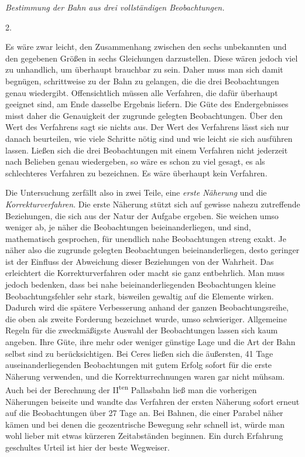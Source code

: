 %
\begin{center}\emph{Bestimmung der Bahn aus drei vollständigen Beobachtungen.}\end{center}
\begin{center}2.\end{center}
Es wäre zwar leicht, den Zusammenhang zwischen den sechs unbekannten und den gegebenen Größen in sechs Gleichungen darzustellen. Diese wären jedoch viel zu unhandlich, um überhaupt brauchbar zu sein. Daher muss man sich damit begnügen, schrittweise zu der Bahn zu gelangen, die die drei Beobachtungen genau wiedergibt. Offensichtlich müssen alle Verfahren, die dafür überhaupt geeignet sind, am Ende dasselbe Ergebnis liefern. Die Güte des Endergebnisses misst daher die Genauigkeit der zugrunde gelegten Beobachtungen. Über den Wert des Verfahrens sagt sie nichts aus. Der Wert des Verfahrens lässt sich nur danach beurteilen, wie viele Schritte nötig sind und wie leicht sie sich ausführen lassen. Ließen sich die drei Beobachtungen mit einem Verfahren nicht jederzeit nach Belieben genau wiedergeben, so wäre es schon zu viel gesagt, es als schlechteres Verfahren zu bezeichnen. Es wäre überhaupt kein Verfahren.

Die Untersuchung zerfällt also in zwei Teile, eine \emph{erste Näherung} und die \emph{Korrekturverfahren}. Die erste Näherung stützt sich auf gewisse nahezu zutreffende Beziehungen, die sich aus der Natur der Aufgabe ergeben. Sie weichen umso weniger ab, je näher die Beobachtungen beieinanderliegen, und sind, mathematisch gesprochen, für unendlich nahe Beobachtungen streng exakt. Je näher also die zugrunde gelegten Beobachtungen beieinanderliegen, desto geringer ist der Einfluss der Abweichung dieser Beziehungen von der Wahrheit. Das erleichtert die Korrekturverfahren oder macht sie ganz entbehrlich. Man muss jedoch bedenken, dass bei nahe beieinanderliegenden Beobachtungen kleine Beobachtungsfehler sehr stark, bisweilen gewaltig auf die Elemente wirken. Dadurch wird die spätere Verbesserung anhand der ganzen Beobachtungsreihe, die oben als zweite Forderung bezeichnet wurde, umso schwieriger. Allgemeine Regeln für die zweckmäßigste Auswahl der Beobachtungen lassen sich kaum angeben. Ihre Güte, ihre mehr oder weniger günstige Lage und die Art der Bahn selbst sind zu berücksichtigen. Bei Ceres ließen sich die äußersten, 41 Tage auseinanderliegenden Beobachtungen mit gutem Erfolg sofort für die erste Näherung verwenden, und die Korrekturrechnungen waren gar nicht mühsam. Auch bei der Berechnung der II\textsuperscript{ten} Pallasbahn ließ man die vorherigen Näherungen beiseite und wandte das Verfahren der ersten
%
Näherung sofort erneut auf die Beobachtungen über 27 Tage an. Bei Bahnen, die einer Parabel näher kämen und bei denen die geozentrische Bewegung sehr schnell ist, würde man wohl lieber mit etwas kürzeren Zeitabständen beginnen. Ein durch Erfahrung geschultes Urteil ist hier der beste Wegweiser.

